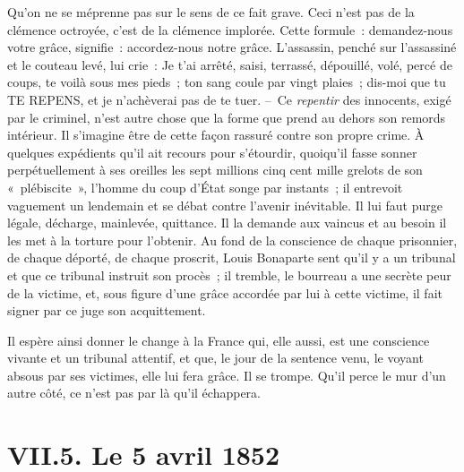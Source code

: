 \documentclass[french,twoside]{book} %
\begin{document}
\noindent Qu’on ne se méprenne pas sur le sens de ce fait grave. Ceci n’est pas de la clémence octroyée, c’est de la clémence implorée. Cette formule : demandez-nous votre grâce, signifie : accordez-nous notre grâce. L’assassin, penché sur l’assassiné et le couteau levé, lui crie : Je t’ai arrêté, saisi, terrassé, dépouillé, volé, percé de coups, te voilà sous mes pieds ; ton sang coule par vingt plaies ; dis-moi que tu TE REPENS, et je n’achèverai pas de te tuer. – Ce \emph{repentir} des innocents, exigé par le criminel, n’est autre chose que la forme que prend au dehors son remords intérieur. Il s’imagine être de cette façon rassuré contre son propre crime. À quelques expédients qu’il ait recours pour s’étourdir, quoiqu’il fasse sonner perpétuellement à ses oreilles les sept millions cinq cent mille grelots de son « plébiscite », l’homme du coup d’État songe par instants ; il entrevoit vaguement un lendemain et se débat contre l’avenir inévitable. Il lui faut purge légale, décharge, mainlevée, quittance. Il la demande aux vaincus et au besoin il les met à la torture pour l’obtenir. Au fond de la conscience de chaque prisonnier, de chaque déporté, de chaque proscrit, Louis Bonaparte sent qu’il y a un tribunal et que ce tribunal instruit son procès ; il tremble, le bourreau a une secrète peur de la victime, et, sous figure d’une grâce accordée par lui à cette victime, il fait signer par ce juge son acquittement.\par
Il espère ainsi donner le change à la France qui, elle aussi, est une conscience vivante et un tribunal attentif, et que, le jour de la sentence venu, le voyant absous par ses victimes, elle lui fera grâce. Il se trompe. Qu’il perce le mur d’un autre côté, ce n’est pas par là qu’il échappera.

\section[{VII.5. Le 5 avril 1852}]{VII.5. Le 5 avril 1852}
\end{document}
